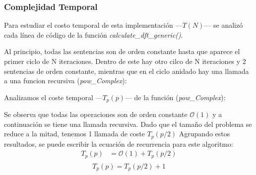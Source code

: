 \documentclass{article}
\begin{document}
    \subsubsection{Complejidad Temporal}
      Para estudiar el costo temporal de esta implementación ---$T(N)$--- se analizó
    cada línea de código de la función \textit{calculate\_dft\_generic()}.\par
    Al principio, todas las sentencias son de orden constante hasta que
    aparece el primer ciclo de N iteraciones. Dentro de este hay otro cilco de N 
  iteraciones y 2 sentencias de orden constante, mientras que en el ciclo anidado 
  hay una llamada a una funcion recursiva (\textit{pow\_Complex}):
  
  Analizamos el coste temporal ---$T_p(p)$--- de la función (\textit{pow\_Complex}):
  
    Se observa que todas las operaciones son de orden constante $\mathcal{O}(1)$ 
    y a continuación se tiene una llamada recursiva. Dado que el tamaño del problema se reduce 
    a la mitad, tenemos 1 llamada de coste $T_p(p/2)$
    Agrupando estos resultados, se puede escribir la
      ecuación de recurrencia para este algoritmo:
    \begin{align*}
      T_p(p) &= \mathcal{O}(1) + T_p(p/2)\\
  \end{align*}
      \begin{equation*}
        \boxed{T_p(p) = T_p(p/2) + 1}
      \end{equation*}
    
\end{document}
